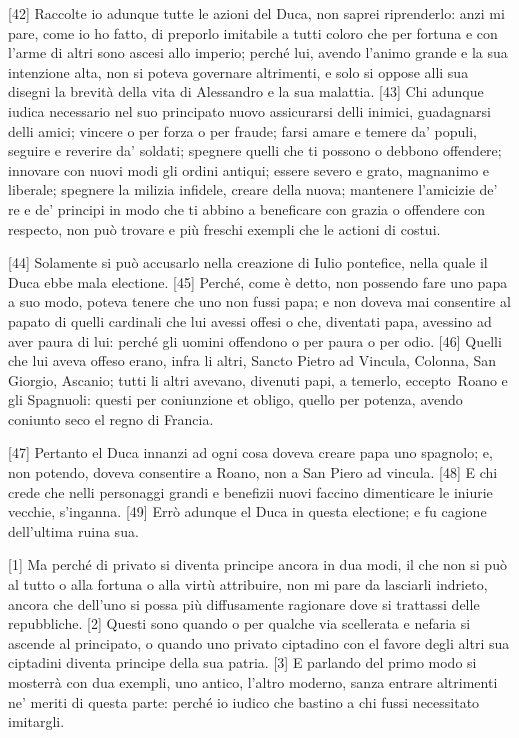 \pagebreak

{[}42{]} Raccolte io adunque tutte le azioni del Duca, non saprei
riprenderlo: anzi mi pare, come io ho fatto, di preporlo imitabile a
tutti coloro che per fortuna e con l'arme di altri sono ascesi allo
imperio; perché lui, avendo l'animo grande e la sua intenzione alta, non
si poteva governare altrimenti, e solo si oppose alli sua disegni la
brevità della vita di Alessandro e la sua malattia. {[}43{]} Chi adunque
iudica necessario nel suo principato nuovo assicurarsi delli inimici,
guadagnarsi delli amici; vincere o per forza o per fraude; farsi amare e
temere da' populi, seguire e reverire da' soldati; spegnere quelli che
ti possono o debbono offendere; innovare con nuovi modi gli ordini
antiqui; essere severo e grato, magnanimo e liberale; spegnere la
milizia infidele, creare della nuova; mantenere l'amicizie de' re e de'
principi in modo che ti abbino a beneficare con grazia o offendere con
respecto, non può trovare e più freschi exempli che le actioni di
costui.

{[}44{]} Solamente si può accusarlo nella creazione di Iulio pontefice,
nella quale il Duca ebbe mala electione. {[}45{]} Perché, come è detto,
non possendo fare uno papa a suo modo, poteva tenere che uno non fussi
papa; e non doveva mai consentire al papato di quelli cardinali che lui
avessi offesi o che, diventati papa, avessino ad aver paura di lui:
perché gli uomini offendono o per paura o per odio. {[}46{]} Quelli che
lui aveva offeso erano, infra li altri, Sancto Pietro ad Vincula,
Colonna, San Giorgio, Ascanio; tutti li altri avevano, divenuti papi, a
temerlo, eccepto\est\ Roano e gli Spagnuoli: questi per coniunzione et
obligo, quello per potenza, avendo coniunto seco el regno di Francia.

{[}47{]} Pertanto el Duca innanzi ad ogni cosa doveva creare papa uno
spagnolo; e, non potendo, doveva consentire a Roano, non a San Piero ad
vincula. {[}48{]} E chi crede che nelli personaggi grandi e benefizii
nuovi faccino dimenticare le iniurie vecchie, s'inganna. {[}49{]} Errò
adunque el Duca in questa electione; e fu cagione dell'ultima ruina sua.


{[}1{]} Ma perché di privato si diventa principe ancora in dua modi, il
che non si può al tutto o alla fortuna o alla virtù attribuire, non mi
pare da lasciarli indrieto, ancora che dell'uno si possa più
diffusamente ragionare dove si trattassi delle repubbliche. {[}2{]}
Questi sono quando o per qualche via scellerata e nefaria si ascende al
principato, o quando uno privato ciptadino con el favore degli altri sua
ciptadini diventa principe della sua patria. {[}3{]} E parlando del
primo modo si mosterrà con dua exempli, uno antico, l'altro moderno,
sanza entrare altrimenti ne' meriti di questa parte: perché io iudico
che bastino a chi fussi necessitato imitargli.

